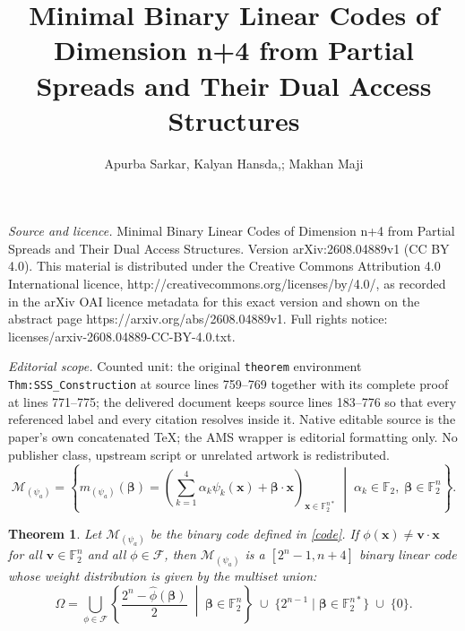\documentclass[10pt,a4paper]{amsart}
\newtheorem{theorem}{Theorem}%
\begin{document}
\title[Minimal Binary Linear Codes of Dimension n+4 from Partial Sp]{Minimal Binary Linear Codes of Dimension n+4 from Partial Spreads and Their Dual Access Structures}
\author{Apurba Sarkar, Kalyan Hansda,; Makhan Maji}
\date{}
\maketitle
\noindent\emph{Source and licence.} Minimal Binary Linear Codes of Dimension n+4 from Partial Spreads and Their Dual Access Structures. Version arXiv:2608.04889v1 (CC BY 4.0). This material is distributed under the Creative Commons Attribution 4.0 International licence, http://creativecommons.org/licenses/by/4.0/, as recorded in the arXiv OAI licence metadata for this exact version and shown on the abstract page https://arxiv.org/abs/2608.04889v1. Full rights notice: licenses/arxiv-2608.04889-CC-BY-4.0.txt.\par\smallskip
\noindent\textit{Editorial scope.} Counted unit: the original \texttt{theorem} environment \texttt{Thm:SSS\_Construction} at source lines 759--769 together with its complete proof at lines 771--775; the delivered document keeps source lines 183--776 so that every referenced label and every citation resolves inside it. Native editable source is the paper's own concatenated TeX; the AMS wrapper is editorial formatting only. No publisher class, upstream script or unrelated artwork is redistributed.
\begin{equation}\label{code}
\mathcal{M}_{(\psi_a)} = \left\{ m_{(\psi_a)}(\mathbf{\beta}) = \left( \sum_{k=1}^{4} \alpha_k \psi_k(\mathbf{x}) + \mathbf{\beta} \cdot \mathbf{x} \right)_{\mathbf{x} \in \mathbb{F}_2^{n*}} \;\middle|\; \alpha_k \in \mathbb{F}_2,\; \mathbf{\beta} \in \mathbb{F}_2^n \right\}.
\end{equation}

\begin{theorem}\label{C_weight}
Let $\mathcal{M}_{(\psi_a)}$ be the binary code defined in \eqref{code}. If $\phi(\mathbf{x})\neq \mathbf{v}\cdot \mathbf{x}$ for all $\mathbf{v} \in \mathbb{F}_2^n$ and all $\phi \in \mathcal{F}$, then $\mathcal{M}_{(\psi_a)}$ is a $[2^n-1, n+4]$ binary linear code whose weight distribution is given by the multiset union:
\begin{equation}\label{eq:multiset_weight}
\Omega = \bigcup_{\phi \in \mathcal{F}} \left\{ \frac{2^{n} - \hat{\phi}(\mathbf{\beta})}{2} \;\middle|\; \mathbf{\beta} \in \mathbb{F}_{2}^{n} \right\} \;\cup\; \{2^{n-1} \mid \mathbf{\beta} \in \mathbb{F}_{2}^{n*}\} \;\cup\; \{0\}.
\end{equation}
\end{theorem}
\end{document}
